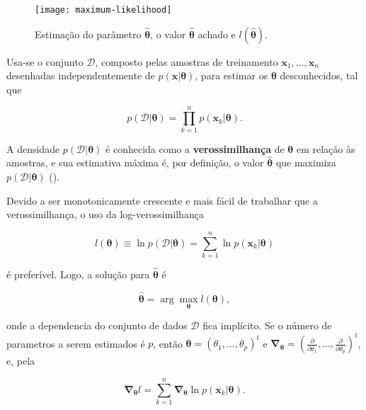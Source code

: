 \begin{figure}[ht]
    \centering
    \texttt{[image: maximum-likelihood]}
    \caption{Estimação do parâmetro $\boldsymbol{\hat{\theta}}$, o valor $\boldsymbol{\hat{\theta}}$ achado e $l(\boldsymbol{\hat{\theta}})$.}
    \label{fig:maximum-likelihood}
\end{figure}

Usa-se o conjunto $\mathcal{D}$, composto pelas amostras de treinamento $\boldsymbol{x}_1, ..., \boldsymbol{x}_n$ desenhadas independentemente de $p(\boldsymbol{x}|\boldsymbol{\theta})$, para estimar os $\boldsymbol{\theta}$ desconhecidos, tal que

\begin{equation}
    p(\mathcal{D}|\boldsymbol{\theta}) = \prod_{k=1}^{n} p(\boldsymbol{x}_k|\boldsymbol{\theta}).
    \label{eq:pdf_D}
\end{equation}

\noindent A densidade $p(\mathcal{D}|\boldsymbol{\theta})$ é conhecida como a \textbf{verossimilhança} de $\boldsymbol{\theta}$ em relação às amostras, e sua estimativa máxima é, por definição, o valor $\boldsymbol{\hat{\theta}}$ que maximiza  $p(\mathcal{D}|\boldsymbol{\theta})$ ().

Devido a ser monotonicamente crescente e mais fácil de trabalhar que a verossimilhança, o uso da log-verossimilhança

\begin{equation}
    l(\boldsymbol{\theta}) \equiv \ln p(\mathcal{D}|\boldsymbol{\theta}) = \sum_{k=1}^{n} \ln p(\boldsymbol{x}_k|\boldsymbol{\theta})
    \label{eq:log_likelihood}
\end{equation}

\noindent é preferível. Logo, a solução para $\boldsymbol{\hat{\theta}}$ é

\begin{equation}
    \boldsymbol{\hat{\theta}} = \arg\max_{\boldsymbol{\theta}} l(\boldsymbol{\theta}),
    \label{eq:hat_theta}
\end{equation}

\noindent onde a dependencia do conjunto de dados $\mathcal{D}$ fica implícito. Se o número de parametros a serem estimados é $p$, então $\boldsymbol{\theta} = (\theta_1, ..., \theta_p)^t$ e $\boldsymbol{\nabla}_{\boldsymbol{\theta}} = (\frac{\partial}{\partial \theta_1}, ..., \frac{\partial}{\partial \theta_p})^t$, e, pela 

\begin{equation}
    \boldsymbol{\nabla}_{\boldsymbol{\theta}} l = \sum_{k=1}^{n} \boldsymbol{\nabla}_{\boldsymbol{\theta}} \ln p(\boldsymbol{x}_k|\boldsymbol{\theta}).
    \label{eq:gradient_theta_log}
\end{equation}

